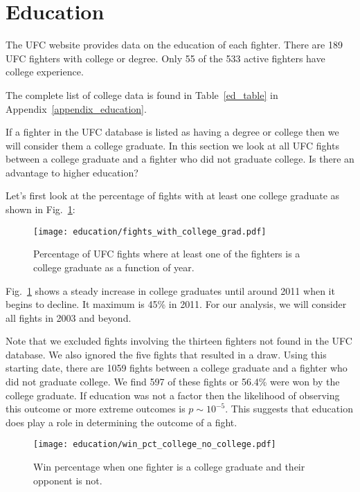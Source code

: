\clearpage
\section{Education}

The UFC website provides data on the education of each fighter.
There are 189 UFC fighters with college or degree. Only 55
of the 533 active fighters have college experience.

The complete list of college data is found in Table~\ref{ed_table}
in Appendix~\ref{appendix_education}.

If a fighter in the UFC database is listed as having a degree
or college then we will consider them a college graduate. In
this section we look at all UFC fights between a college graduate
and a fighter who did not graduate college. Is there an advantage
to higher education?

Let's first look at the percentage of fights with at least
one college graduate as shown in Fig.~\ref{fights_with_college_grad}:

\begin{figure}[h]
\begin{center}
\texttt{[image: education/fights\_with\_college\_grad.pdf]}
\caption{Percentage of UFC fights where at least one of the fighters
is a college graduate as a function of year.}
\label{fights_with_college_grad}
\end{center}
\end{figure}

Fig.~\ref{fights_with_college_grad} shows a steady increase in
college graduates until around 2011 when it begins to decline.
It maximum is 45\% in 2011. For our analysis, we will consider
all fights in 2003 and beyond.

Note that we excluded fights involving the thirteen fighters
not found in the UFC database. We also ignored the five fights that resulted
in a draw.
Using this starting date, there are 1059 fights between a college
graduate and a fighter who did not graduate college. We find
597 of these fights or 56.4\% were won by the college graduate.
If education was not a factor then the likelihood of observing
this outcome or more extreme outcomes is $p\sim10^{-5}$. This
suggests that education does play a role in determining the outcome
of a fight.

\begin{figure}[h]
\begin{center}
\texttt{[image: education/win\_pct\_college\_no\_college.pdf]}
\caption{Win percentage when one fighter is a college graduate and their
opponent is not.}
\label{win_pct_college_no_college}
\end{center}
\end{figure}
